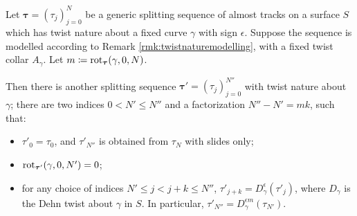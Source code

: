 \begin{lemma}\label{lem:dehn+remainder}
Let $\bm\tau=(\tau_j)_{j=0}^N$ be a generic splitting sequence of almost tracks on a surface $S$ which has twist nature about a fixed curve $\gamma$ with sign $\epsilon$. Suppose the sequence is modelled according to Remark \ref{rmk:twistnaturemodelling}, with a fixed twist collar $A_\gamma$. Let $m\coloneqq \mathrm{rot}_{\bm\tau}(\gamma,0,N)$.

Then there is another splitting sequence $\bm\tau'=(\tau_j)_{j=0}^{N''}$ with twist nature about $\gamma$; there are two indices $0<N'\leq N''$ and a factorization $N''-N'=mk$, such that:
\begin{itemize}
\item $\tau'_0=\tau_0$, and $\tau'_{N''}$ is obtained from $\tau_N$ with slides only;
\item $\mathrm{rot}_{\bm\tau'}(\gamma,0,N')=0$;
\item for any choice of indices $N'\leq j < j+k\leq N''$, $\tau'_{j+k}=D_\gamma^{\epsilon}(\tau'_j)$, where $D_\gamma$ is the Dehn twist about $\gamma$ in $S$. In particular, $\tau'_{N''}=D_\gamma^{\epsilon m}(\tau_{N'})$.
\end{itemize}
\end{lemma}
